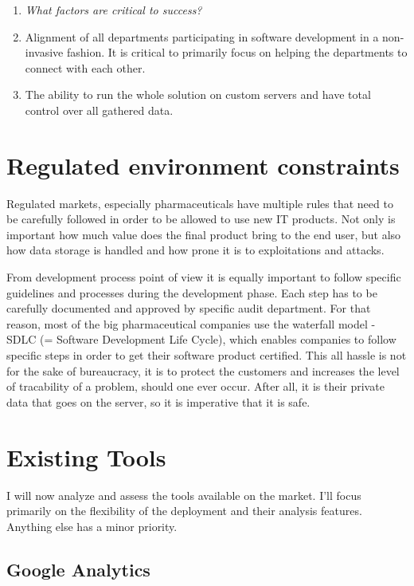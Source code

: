 \begin{enumerate}
	\item \emph{What factors are critical to success?	}
	\item[] Alignment of all departments participating in software development in a non-invasive fashion. It is critical to primarily focus on helping the departments to connect with each other.
	\item[] The ability to run the whole solution on custom servers and have total control over all gathered data.
	
\end{enumerate}


\section{Regulated environment constraints}

Regulated markets, especially pharmaceuticals have multiple rules that need to be carefully followed in order to be allowed to use new IT products. Not only is important how much value does the final product bring to the end user, but also how data storage is handled and how prone it is to exploitations and attacks. 

From development process point of view it is equally important to follow specific guidelines and processes during the development phase. Each step has to be carefully documented and approved by specific audit department. For that reason, most of the big pharmaceutical companies use the waterfall model - SDLC (= Software Development Life Cycle), which enables companies to follow specific steps in order to get their software product certified. This all hassle is not for the sake of bureaucracy, it is to protect the customers and increases the level of tracability of a problem, should one ever occur. After all, it is their private data that goes on the server, so it is imperative that it is safe.


\section{Existing Tools}

I will now analyze and assess the tools available on the market. I'll focus primarily on the flexibility of the deployment and their analysis features. Anything else has a minor priority.

\subsection{Google Analytics}


